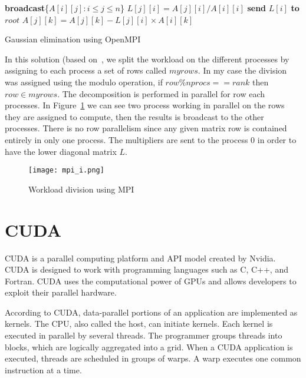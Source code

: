 \begin{algorithm}[H]
\begin{algorithmic}
	\State \textbf{broadcast}\{$A[i][j] : i \leq j \leq n $\}
		\State $L[j][i] = A[j][i] / A[i][i]$ 
	\EndFor
	\State \textbf{send} $L[i]$ \textbf{to} $root$ 
			\State $A[j][k] = A[j][k] - L[j][i] \times A[i][k]$ 
		\EndFor	
	\EndFor
\EndFor
\end{algorithmic}
\caption{Gaussian elimination using OpenMPI}
\label{alg:mpi_code}
\end{algorithm}

In this solution (based on~\cite{Health2015}, we split the workload on the different processes by assigning to each process a set of rows called $myrows$. In my case the division was assigned using the modulo operation, if $row \% nprocs == rank$ then $row \in myrows$. 
The decomposition is performed in parallel for row each processes. In Figure~\ref{img:mpi_workload} we can see two process working in parallel on the rows they are assigned to compute, then the results is broadcast to the other processes. There is no row parallelism since any given matrix row is contained entirely in only one process. The multipliers are sent to the process 0 in order to have the lower diagonal matrix $L$.


\begin{figure}[H]
\centering
\texttt{[image: mpi\_i.png]}
\caption{Workload division using MPI}
\label{img:mpi_workload}
\end{figure}



\section{CUDA}
CUDA is a parallel computing platform and API model created by Nvidia. CUDA  is designed to work with programming languages such as C, C++, and Fortran.  CUDA uses the computational power of GPUs and allows developers to exploit their parallel hardware. 

According to CUDA, data-parallel portions of an application
are implemented as kernels. The CPU, also called the host, can
initiate kernels. Each kernel is executed in parallel by
several threads. The programmer groups threads into blocks, which
are logically aggregated into a grid. When a CUDA application is
executed, threads are scheduled in groups of warps. A warp executes
one common instruction at a time.

